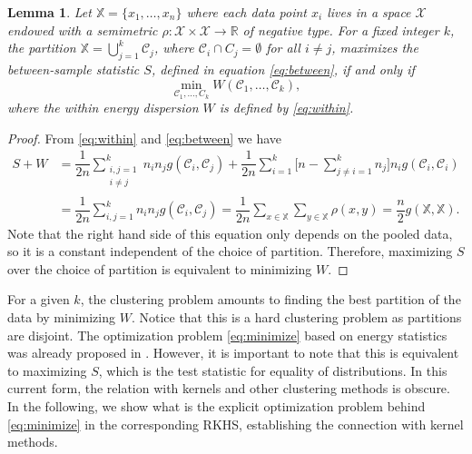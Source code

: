 \documentclass[aps,preprint,nofootinbib,floatfix]{revtex4-1}
\newtheorem{lemma}[theorem]{Lemma}
\newcommand\C{{\mathcal{C}}}
\begin{document}
\begin{lemma}
\label{th:minimize}
Let $\mathbb{X} = \{x_1,\dotsc,x_n\}$ where each data point
$x_i$ lives in a space $\mathcal{X}$ endowed with a semimetric $\rho:
\mathcal{X}\times\mathcal{X} \to \mathbb{R}$ of
negative type. For a fixed integer $k$,
the partition
$\mathbb{X} = \bigcup_{j=1}^k \C_j$, where $\C_i \cap C_j = \emptyset$ for
all $i\ne j$, maximizes the between-sample statistic $S$, defined
in equation \eqref{eq:between}, if and only if
\begin{equation}
\label{eq:minimize}
\min_{\C_1,\dotsc,C_k  } W(
\C_1, \dotsc, \C_k),
\end{equation}
where the within energy dispersion $W$ is defined by \eqref{eq:within}.
\end{lemma}
\begin{proof}
From \eqref{eq:within} and \eqref{eq:between}
we have
\begin{equation}
\begin{split}
S + W &= 
\dfrac{1}{2n} \sum_{\substack{i,j=1 \\ i\ne j}}^k n_i n_j g(\C_i, \C_j)
+ \dfrac{1}{2n} \sum_{i=1}^{k} 
\bigg[ n - 
\sum_{j\ne i = 1}^k n_j \bigg] 
n_i g(\C_i, \C_i) \\
& = \dfrac{1}{2n} \sum_{i,j=1}^k n_i n_j g(\C_i, \C_j) 
= \dfrac{1}{2n} \sum_{x \in \mathbb{X}} \sum_{y \in \mathbb{X}} \rho(x,y) 
= \dfrac{n}{2} g(\mathbb{X}, \mathbb{X}).
\end{split}
\end{equation}
Note that the right hand side of this equation 
only depends on the pooled data, so it is a constant
independent of the choice of partition. Therefore, maximizing
$S$ over the choice of partition is equivalent to minimizing $W$.
\end{proof}

For a given $k$, the clustering problem amounts to
finding the best partition of the data by minimizing $W$.
Notice that this is a hard clustering problem as partitions
are disjoint. The optimization problem \eqref{eq:minimize} based on
energy statistics was already proposed in \cite{Kgroups}. However, it is
important to note that this is equivalent to maximizing $S$,
which is the test statistic for equality of distributions. In this current
form, the relation with kernels and other clustering methods is obscure.
In the following, we show what is the explicit optimization problem behind 
\eqref{eq:minimize} in the corresponding RKHS, 
establishing the connection with kernel methods.
\end{document}
